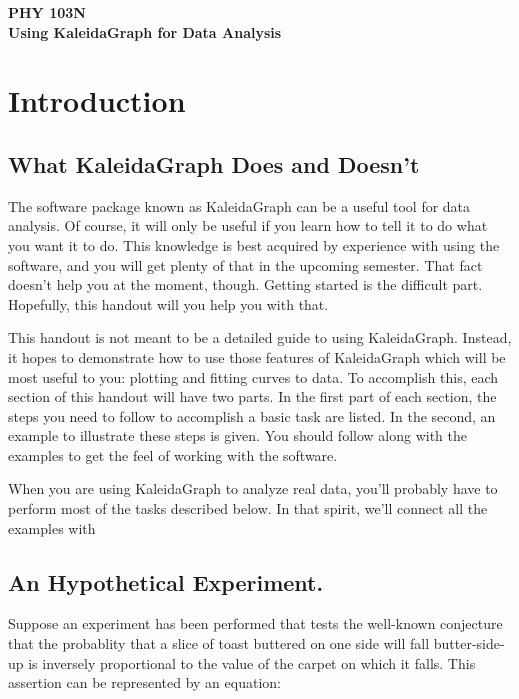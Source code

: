 \documentclass[12pt]{article}
\begin{document}
\pagestyle{empty}
\begin{center}
{\LARGE \bf PHY 103N} \\
\vspace*{3mm}
{\large \bf Using KaleidaGraph for Data Analysis}
\end{center}

\section{Introduction}
\subsection{What KaleidaGraph Does and Doesn't}

The software package known as KaleidaGraph can be a useful tool for data
analysis. Of course, it will only be useful if you learn how to tell it to do what you
want it to do. This knowledge is best acquired by experience with using the
software, and you will get plenty of that in the upcoming semester. That fact
doesn't help you at the moment, though. Getting started is the difficult part.
Hopefully, this handout will you help you with that. 

This handout is not meant to be a detailed guide to using KaleidaGraph. Instead,
it hopes to demonstrate how to use those features of KaleidaGraph which will be
most useful to you: plotting and fitting curves to data. To accomplish this, each
section of this handout will have two parts. In the first part of each section, the
steps you need to follow to accomplish a basic task are listed. In the second, an
example to illustrate these steps is given. You should follow along with the examples
to get the feel of working with the software. 

When you are using KaleidaGraph to analyze real data, you'll probably have to
perform most of the tasks described below. In that spirit, we'll connect all the
examples with

\subsection{An Hypothetical Experiment.}

Suppose an experiment has been performed that tests the well-known conjecture that the
probablity that a slice of toast buttered on one side will fall butter-side-up is
inversely proportional to the value of the carpet on which it falls. This assertion
can be represented by an equation:
\end{document}
